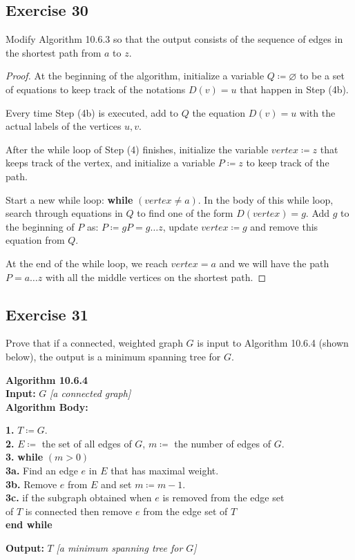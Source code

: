 \documentclass[14pt]{extarticle}
\newcommand{\es}{\varnothing}
\newcommand{\cy}{\color{cyan}}
\begin{document}
\subsection{Exercise 30}
Modify Algorithm 10.6.3 so that the output consists of the sequence of edges in the shortest path from \(a\) to \(z\).

\begin{proof}
    At the beginning of the algorithm, initialize a variable \(Q \coloneqq \es\) to be a set of equations to keep track of the
    notations \(D(v) = u\) that happen in Step (4b).

    Every time Step (4b) is executed, add to \(Q\) the equation \(D(v) = u\) with the actual labels of the vertices \(u,v\).

    After the while loop of Step (4) finishes, initialize the variable \(vertex \coloneqq z\) that keeps track of the
    vertex, and initialize a variable \(P \coloneqq z\) to keep track of the path.

    Start a new while loop: {\bf while} \((vertex \neq a)\). In the body of this while loop, search through equations in \(Q\)
    to find one of the form \(D(vertex) = g\). Add \(g\) to the beginning of \(P\) as: \(P \coloneqq gP = g \ldots z\), update \(vertex \coloneqq g\) and remove this equation from \(Q\).

    At the end of the while loop, we reach \(vertex = a\) and we will have the path \(P = a \ldots z\) with all the middle
    vertices on the shortest path.
\end{proof}

\subsection{Exercise 31}
Prove that if a connected, weighted graph \(G\) is input to Algorithm 10.6.4 (shown below), the output is a minimum
spanning tree for \(G\).

\begin{tcolorbox}[colframe=cyan]
    {\bf \cy Algorithm 10.6.4} \\
    {\bf Input:} \(G\) {\it [a connected graph]} \\
    {\bf Algorithm Body:}
    \begin{tabbing}
        {\bf 1.} \(T \coloneqq G\). \\
        {\bf 2.} \(E \coloneqq\) the set of all edges of \(G\), \(m \coloneqq\) the number of edges of \(G\). \\
        {\bf 3.} {\bf while} \= \((m > 0)\) \\
        \> {\bf 3a.} Find an edge \(e\) in \(E\) that has maximal weight. \\
        \> {\bf 3b.} Remove \(e\) from \(E\) and set \(m \coloneqq m - 1\). \\
        \> {\bf 3c.} if the subgraph obtained when \(e\) is removed from the edge set \\
        \> of \(T\) is connected then remove \(e\) from the edge set of \(T\) \\
        {\bf end while}
    \end{tabbing}
    {\bf Output:} \(T\) {\it [a minimum spanning tree for \(G\)]}
\end{tcolorbox}
\end{document}
